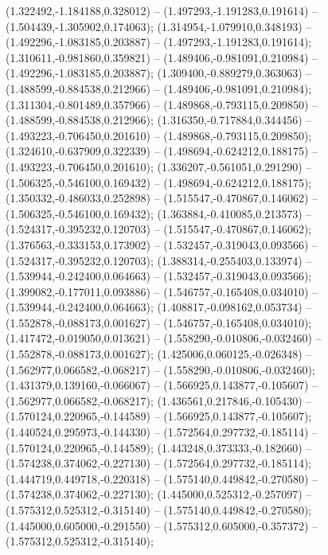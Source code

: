  (1.322492,-1.184188,0.328012) -- (1.497293,-1.191283,0.191614) -- (1.504439,-1.305902,0.174063);
 (1.314954,-1.079910,0.348193) -- (1.492296,-1.083185,0.203887) -- (1.497293,-1.191283,0.191614);
 (1.310611,-0.981860,0.359821) -- (1.489406,-0.981091,0.210984) -- (1.492296,-1.083185,0.203887);
 (1.309400,-0.889279,0.363063) -- (1.488599,-0.884538,0.212966) -- (1.489406,-0.981091,0.210984);
 (1.311304,-0.801489,0.357966) -- (1.489868,-0.793115,0.209850) -- (1.488599,-0.884538,0.212966);
 (1.316350,-0.717884,0.344456) -- (1.493223,-0.706450,0.201610) -- (1.489868,-0.793115,0.209850);
 (1.324610,-0.637909,0.322339) -- (1.498694,-0.624212,0.188175) -- (1.493223,-0.706450,0.201610);
 (1.336207,-0.561051,0.291290) -- (1.506325,-0.546100,0.169432) -- (1.498694,-0.624212,0.188175);
 (1.350332,-0.486033,0.252898) -- (1.515547,-0.470867,0.146062) -- (1.506325,-0.546100,0.169432);
 (1.363884,-0.410085,0.213573) -- (1.524317,-0.395232,0.120703) -- (1.515547,-0.470867,0.146062);
 (1.376563,-0.333153,0.173902) -- (1.532457,-0.319043,0.093566) -- (1.524317,-0.395232,0.120703);
 (1.388314,-0.255403,0.133974) -- (1.539944,-0.242400,0.064663) -- (1.532457,-0.319043,0.093566);
 (1.399082,-0.177011,0.093886) -- (1.546757,-0.165408,0.034010) -- (1.539944,-0.242400,0.064663);
 (1.408817,-0.098162,0.053734) -- (1.552878,-0.088173,0.001627) -- (1.546757,-0.165408,0.034010);
 (1.417472,-0.019050,0.013621) -- (1.558290,-0.010806,-0.032460) -- (1.552878,-0.088173,0.001627);
 (1.425006,0.060125,-0.026348) -- (1.562977,0.066582,-0.068217) -- (1.558290,-0.010806,-0.032460);
 (1.431379,0.139160,-0.066067) -- (1.566925,0.143877,-0.105607) -- (1.562977,0.066582,-0.068217);
 (1.436561,0.217846,-0.105430) -- (1.570124,0.220965,-0.144589) -- (1.566925,0.143877,-0.105607);
 (1.440524,0.295973,-0.144330) -- (1.572564,0.297732,-0.185114) -- (1.570124,0.220965,-0.144589);
 (1.443248,0.373333,-0.182660) -- (1.574238,0.374062,-0.227130) -- (1.572564,0.297732,-0.185114);
 (1.444719,0.449718,-0.220318) -- (1.575140,0.449842,-0.270580) -- (1.574238,0.374062,-0.227130);
 (1.445000,0.525312,-0.257097) -- (1.575312,0.525312,-0.315140) -- (1.575140,0.449842,-0.270580);
 (1.445000,0.605000,-0.291550) -- (1.575312,0.605000,-0.357372) -- (1.575312,0.525312,-0.315140);
